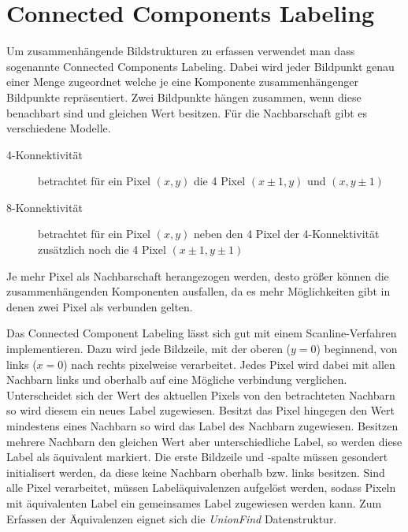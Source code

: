 \section*{Connected Components Labeling}

Um zusammenhängende Bildstrukturen zu erfassen verwendet man dass sogenannte Connected Components Labeling. Dabei wird jeder Bildpunkt genau einer Menge zugeordnet welche je eine Komponente zusammenhängenger Bildpunkte repräsentiert.
Zwei Bildpunkte hängen zusammen, wenn diese benachbart sind und gleichen Wert besitzen. Für die Nachbarschaft gibt es verschiedene Modelle.

\begin{description}
\item[4-Konnektivität] betrachtet für ein Pixel $(x,y)$ die 4 Pixel $(x\pm1,y)$ und $(x,y\pm1)$
\item[8-Konnektivität] betrachtet für ein Pixel $(x,y)$ neben den 4 Pixel der 4-Konnektivität zusätzlich noch die 4 Pixel $(x\pm1,y\pm1)$
\end{description}
Je mehr Pixel als Nachbarschaft herangezogen werden, desto größer können die zusammenhängenden Komponenten ausfallen, da es mehr Möglichkeiten gibt in denen zwei Pixel als verbunden gelten.

Das Connected Component Labeling lässt sich gut mit einem Scanline-Verfahren implementieren.
Dazu wird jede Bildzeile, mit der oberen ($y=0$) beginnend, von links ($x=0$) nach rechts pixelweise verarbeitet.
Jedes Pixel wird dabei mit allen Nachbarn links und oberhalb auf eine Mögliche verbindung verglichen.
Unterscheidet sich der Wert des aktuellen Pixels von den betrachteten Nachbarn so wird diesem ein neues Label zugewiesen.
Besitzt das Pixel hingegen den Wert mindestens eines Nachbarn so wird das Label des Nachbarn zugewiesen.
Besitzen mehrere Nachbarn den gleichen Wert aber unterschiedliche Label, so werden diese Label als äquivalent markiert.
Die erste Bildzeile und -spalte müssen gesondert initialisert werden, da diese keine Nachbarn oberhalb bzw. links besitzen.
Sind alle Pixel verarbeitet, müssen Labeläquivalenzen aufgelöst werden, sodass Pixeln mit äquivalenten Label ein gemeinsames Label zugewiesen werden kann. Zum Erfassen der Äquivalenzen eignet sich die \emph{UnionFind} Datenstruktur.
